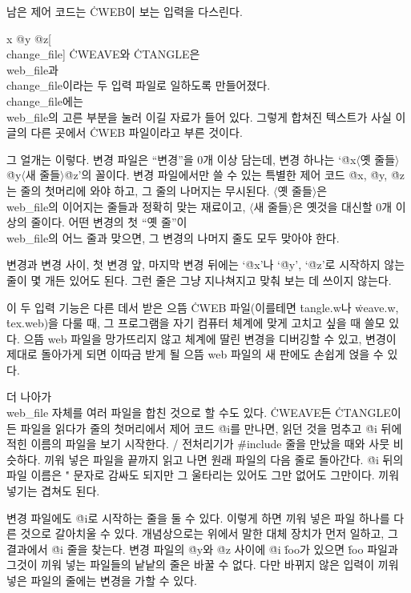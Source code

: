 \subsec
남은 제어 코드는 \.{CWEB}이 보는 입력을 다스린다.

\@{x @y @z}[\\{change\_file}]
\.{CWEAVE}와 \.{CTANGLE}은 \\{web\_file}과 \\{change\_file}이라는 두 입력 파일로
일하도록 만들어졌다. \\{change\_file}에는 \\{web\_file}의 고른 부분을 눌러 이길
자료가 들어 있다. 그렇게 합쳐진 텍스트가 사실 이 글의 다른 곳에서 \.{CWEB}
파일이라고 부른 것이다.

\more 그 얼개는 이렇다. 변경 파일은 ``변경''을 0개 이상 담는데, 변경 하나는
`\.{@x}$\langle$옛 줄들$\rangle$\.{@y}$\langle$새 줄들$\rangle$\.{@z}'의 꼴이다.
변경 파일에서만 쓸 수 있는 특별한 제어 코드 \.{@x}, \.{@y}, \.{@z}는 줄의 첫머리에
와야 하고, 그 줄의 나머지는 무시된다. $\langle$옛 줄들$\rangle$은 \\{web\_file}의
이어지는 줄들과 정확히 맞는 재료이고, $\langle$새 줄들$\rangle$은 옛것을 대신할 0개
이상의 줄이다. 어떤 변경의 첫 ``옛 줄''이 \\{web\_file}의 어느 줄과 맞으면, 그
변경의 나머지 줄도 모두 맞아야 한다.

\more 변경과 변경 사이, 첫 변경 앞, 마지막 변경 뒤에는 `\.{@x}'나 `\.{@y}',
`\.{@z}'로 시작하지 않는 줄이 몇 개든 있어도 된다. 그런 줄은 그냥 지나쳐지고
맞춰 보는 데 쓰이지 않는다.

\more 이 두 입력 기능은 다른 데서 받은 으뜸 \.{CWEB} 파일(이를테면 \.{tangle.w}나
\.{weave.w}, \.{tex.web})을 다룰 때, 그 프로그램을 자기 컴퓨터 체계에 맞게 고치고
싶을 때 쓸모 있다. 으뜸 web 파일을 망가뜨리지 않고 체계에 딸린 변경을 디버깅할 수
있고, 변경이 제대로 돌아가게 되면 이따금 받게 될 으뜸 web 파일의 새 판에도 손쉽게
얹을 수 있다.

 더 나아가 \\{web\_file} 자체를 여러 파일을 합친 것으로 할 수도
있다. \.{CWEAVE}든 \.{CTANGLE}이든 파일을 읽다가 줄의 첫머리에서 제어 코드 \.{@i}를
만나면, 읽던 것을 멈추고 \.{@i} 뒤에 적힌 이름의 파일을 보기 시작한다. \CEE/
전처리기가 \.{\#include} 줄을 만났을 때와 사뭇 비슷하다. 끼워 넣은 파일을 끝까지
읽고 나면 원래 파일의 다음 줄로 돌아간다. \.{@i} 뒤의 파일 이름은 \." 문자로
감싸도 되지만 그 울타리는 있어도 그만 없어도 그만이다. 끼워 넣기는 겹쳐도 된다.

\more 변경 파일에도 \.{@i}로 시작하는 줄을 둘 수 있다. 이렇게 하면 끼워 넣은 파일
하나를 다른 것으로 갈아치울 수 있다. 개념상으로는 위에서 말한 대체 장치가 먼저
일하고, 그 결과에서 \.{@i} 줄을 찾는다. 변경 파일의 \.{@y}와 \.{@z} 사이에
\.{@i} \.{foo}가 있으면 \.{foo} 파일과 그것이 끼워 넣는 파일들의 낱낱의 줄은 바꿀
수 없다. 다만 바뀌지 않은 입력이 끼워 넣은 파일의 줄에는 변경을 가할 수 있다.

